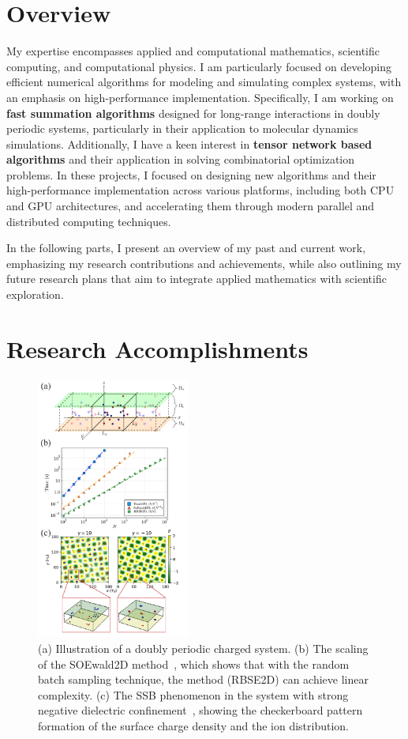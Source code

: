 \section{Overview}

My expertise encompasses applied and computational mathematics, scientific computing, and computational physics. 
I am particularly focused on developing efficient numerical algorithms for modeling and simulating complex systems, with an emphasis on high-performance implementation. 
Specifically, I am working on \textbf{fast summation algorithms} designed for long-range interactions in doubly periodic systems, particularly in their application to molecular dynamics simulations. 
Additionally, I have a keen interest in \textbf{tensor network based algorithms} and their application in solving combinatorial optimization problems.
In these projects, I focused on designing new algorithms and their high-performance implementation across various platforms, including both CPU and GPU architectures, and accelerating them through modern parallel and distributed computing techniques.

In the following parts, I present an overview of my past and current work, emphasizing my research contributions and achievements, while also outlining my future research plans that aim to integrate applied mathematics with scientific exploration.

\section{Research Accomplishments}

\begin{figure}[h]
    \centering
    \includegraphics[width=0.45\textwidth]{figs/Q2D_onec.pdf}
    \caption{(a) Illustration of a doubly periodic charged system. (b) The scaling of the SOEwald2D method~\cite{gan2024fast}, which shows that with the random batch sampling technique, the method (RBSE2D) can achieve linear complexity. (c) The SSB phenomenon in the system with strong negative dielectric confinement~\cite{gao2024broken}, showing the checkerboard pattern formation of the surface charge density and the ion distribution.}
    \label{fig:Q2D}
\end{figure}

